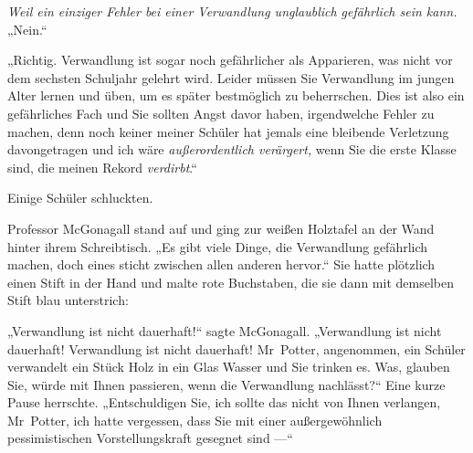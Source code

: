 \emph{Weil ein einziger Fehler bei einer Verwandlung unglaublich gefährlich sein kann.}
„Nein.“

„Richtig. Verwandlung ist sogar noch gefährlicher als Apparieren, was nicht vor dem sechsten Schuljahr gelehrt wird. Leider müssen Sie Verwandlung im jungen Alter lernen und üben, um es später bestmöglich zu beherrschen. Dies ist also ein gefährliches Fach und Sie sollten Angst davor haben, irgendwelche Fehler zu machen, denn noch keiner meiner Schüler hat jemals eine bleibende Verletzung davongetragen und ich wäre \emph{außerordentlich verärgert,} wenn Sie die erste Klasse sind, die meinen Rekord \emph{verdirbt}.“

Einige Schüler schluckten.

Professor McGonagall stand auf und ging zur weißen Holztafel an der Wand hinter ihrem Schreibtisch.
„Es gibt viele Dinge, die Verwandlung gefährlich machen, doch eines sticht zwischen allen anderen hervor.“ Sie hatte plötzlich einen Stift in der Hand und malte rote Buchstaben, die sie dann mit demselben Stift blau unterstrich:


„Verwandlung ist nicht dauerhaft!“ sagte McGonagall.
„Verwandlung ist nicht dauerhaft! Verwandlung ist nicht dauerhaft! Mr~Potter, angenommen, ein Schüler verwandelt ein Stück Holz in ein Glas Wasser und Sie trinken es. Was, glauben Sie, würde mit Ihnen passieren, wenn die Verwandlung nachlässt?“ Eine kurze Pause herrschte.
„Entschuldigen Sie, ich sollte das nicht von Ihnen verlangen, Mr~Potter, ich hatte vergessen, dass Sie mit einer außergewöhnlich pessimistischen Vorstellungskraft gesegnet sind —“

